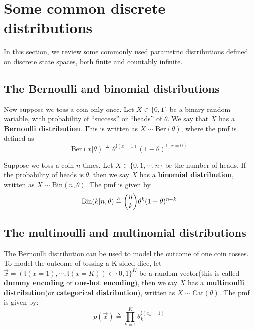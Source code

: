 \documentclass[graybox, envcountchap, twocolumn]{styles/svmult}
\begin{document}
\section{Some common discrete distributions}
In this section, we review some commonly used parametric distributions defined on discrete state spaces, both finite and countably infinite.


\subsection{The Bernoulli and binomial distributions}

\begin{definition}
Now suppose we toss a coin only once. Let $X \in \{0,1\}$ be a binary random variable, with probability of “success” or “heads” of $\theta$. We say that $X$ has a \textbf{Bernoulli distribution}. This is written as $X \sim \text{Ber}(\theta)$, where the pmf is defined as 
\begin{equation}
\text{Ber}(x|\theta) \triangleq \theta^{\mathbb{I}(x=1)}(1-\theta)^{\mathbb{I}(x=0)}
\end{equation}
\end{definition}


\begin{definition}
Suppose we toss a coin $n$ times. Let $X \in \{0,1,\cdots,n\}$ be the number of heads. If the probability of heads is $\theta$, then we say $X$ has a \textbf{binomial distribution}, written as $X \sim \text{Bin}(n, \theta)$. The pmf is given by 
\begin{equation}\label{eqn:binomial-pmf}
\text{Bin}(k|n,\theta) \triangleq \dbinom{n}{k}\theta^k(1-\theta)^{n-k}
\end{equation}
\end{definition}


\subsection{The multinoulli and multinomial distributions}

\begin{definition}
The Bernoulli distribution can be used to model the outcome of one coin tosses. To model the outcome of tossing a K-sided dice, let $\vec{x} =(\mathbb{I}(x=1),\cdots,\mathbb{I}(x=K)) \in \{0,1\}^K$ be a random vector(this is called \textbf{dummy encoding} or \textbf{one-hot encoding}), then we say $X$ has a \textbf{multinoulli distribution}(or \textbf{categorical distribution}), written as $X \sim \text{Cat}(\theta)$. The pmf is given by: 
\begin{equation}
p(\vec{x}) \triangleq \prod\limits_{k=1}^K\theta_k^{\mathbb{I}(x_k=1)}
\end{equation}
\end{definition}
\end{document}
